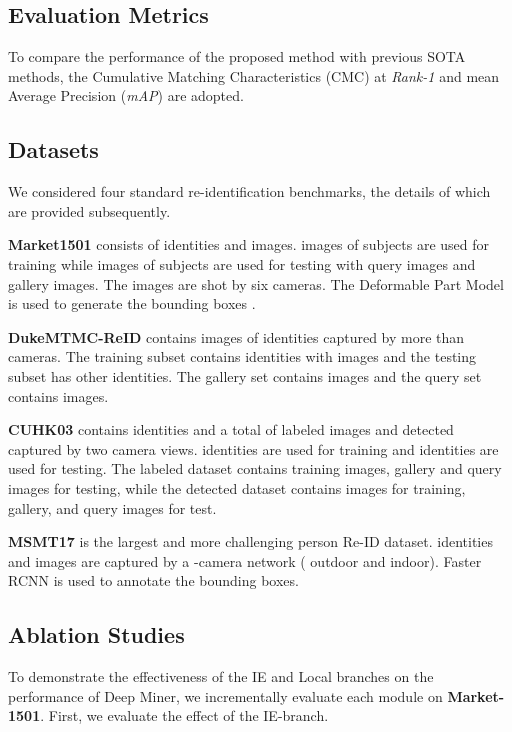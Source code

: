 \documentclass[final]{cvpr}
\begin{document}
\subsection{Evaluation Metrics}

To compare the performance of the proposed method with previous SOTA methods, the Cumulative Matching Characteristics (CMC) at \textit{Rank-1} and mean Average Precision (\textit{mAP}) are adopted. 
\subsection{Datasets}
We considered four standard re-identification benchmarks, the details of which are provided subsequently.

\textbf{Market1501} \cite{zheng2015scalable} consists of  identities and  images.  images of  subjects are used for training while  images of  subjects are used for testing with  query images and  gallery images. The images are shot by six cameras. The Deformable Part Model is used to generate the bounding boxes \cite{felzenszwalb2008discriminatively}.

\textbf{DukeMTMC-ReID} \cite{ristani2016performance} contains  images of  identities captured by more than  cameras. The training subset contains  identities with  images and the testing subset has other  identities. The gallery set contains  images and the query set contains  images. 

\textbf{CUHK03} \cite{li2014deepreid} contains  identities and a total of   labeled images and  detected captured by two camera views.  identities are used for training and  identities are used for testing. The labeled dataset contains  training images,  gallery and  query images for testing, while the detected dataset contains  images for training,  gallery, and  query images for test.

\textbf{MSMT17} \cite{wei2018person} is the largest and more challenging person Re-ID dataset.  identities and   images are captured by a -camera network ( outdoor and  indoor). Faster RCNN \cite{ren2016faster} is used to annotate the bounding boxes. 

\subsection{Ablation Studies}

To demonstrate the effectiveness of the IE and Local branches on the performance of Deep Miner, we incrementally evaluate each module on \textbf{Market-1501}. First, we evaluate the effect of the IE-branch. 
\end{document}
